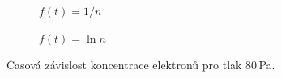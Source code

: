 \documentclass[a4paper,12pt]{article}
\begin{document}
\begin{figure}[h]
	\centering
	\begin{subfigure}[b]{.49\linewidth}
		\centering
		\caption{$f(t) = 1/n$}
	\end{subfigure}
	\begin{subfigure}[b]{.49\linewidth}
		\centering
		\caption{$f(t) = \ln n$}
	\end{subfigure}
	\caption{Časová závislost koncentrace elektronů pro tlak 80\,Pa.}
	\label{g:50Pa}
\end{figure}
\end{document}
